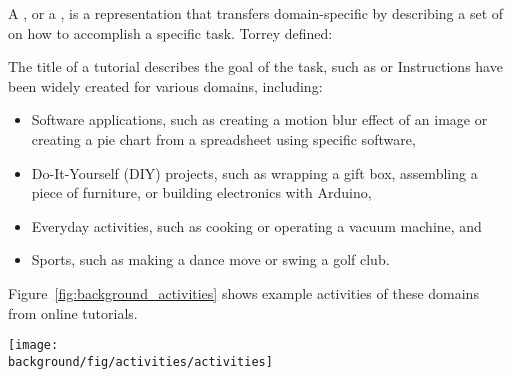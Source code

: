 A , or a , is a representation that transfers domain-specific  by describing a set of  on how to accomplish a specific task. Torrey \ea{} \cite{Torrey:2007he} defined:
\begin{quote}
\end{quote}
%
The title of a tutorial describes the goal of the task, such as  or 
%
Instructions have been widely created for various domains, including:

\begin{itemize}
  \item Software applications, such as creating a motion blur effect of an image or creating a pie chart from a spreadsheet using specific software,
  \item Do-It-Yourself (DIY) projects, such as wrapping a gift box, assembling a piece of furniture, or building electronics with Arduino,
  \item Everyday activities, such as cooking or operating a vacuum machine, and
  \item Sports, such as making a dance move or swing a golf club.
\end{itemize}

Figure~\ref{fig:background_activities} shows example activities of these domains from online tutorials.
\\

\begin{figure*}[b!]
  \centering
  \begin{minipage}{\textwidth}
  \texttt{[image: \\background/fig/activities/activities]}
  \caption[activities]{Example activities in tutorial domains:
  a) image manipulations using a software application
  \footnote{Photoshop Playbook: Selective Focus, \url{https://youtu.be/Wh3ahxqDnyw}},
  b) wrapping a gift, a DIY task
  \footnote{One Kings Lane: How to Wrap the Perfect Gift, \url{https://youtu.be/Me3ykrZobJE}},
  c) cooking, an everyday activity
  \footnote{Slow-cooked black treacle ham, \url{http://www.bbc.co.uk/food/recipes/slow-cooked_black_21152}}, and
  d) ballet dancing in sports
  \footnote{Ballet 101: How to Do the Fouette in Ballet Dancing, \url{https://youtu.be/DzqQNlaahjs}}.
  }
  \label{fig:background_activities}
  \end{minipage}
\end{figure*}

